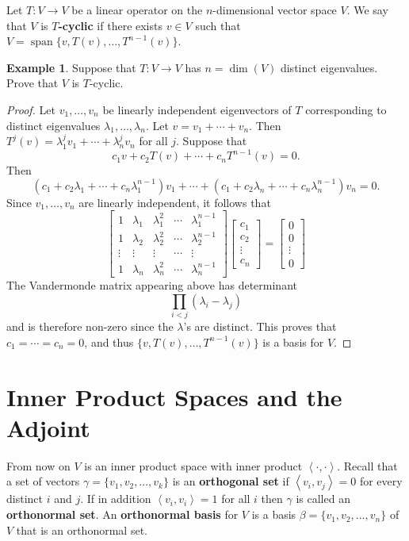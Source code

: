 \documentclass[12pt]{article}
\DeclareMathOperator{\spn}{span}
\newcommand{\tv}{T:V\rightarrow V}
\newcommand{\indot}[1]{\left\langle #1 \right\rangle}
\theoremstyle{definition}
\newtheorem{example}{Example}[section]
\begin{document}
Let $\tv$ be a linear operator on the $n$-dimensional vector space $V$.  We say that $V$ is \textbf{$T$-cyclic} if there exists $v\in V$ such that $V=\spn\{v,T(v),\ldots,T^{n-1}(v)\}$.
\begin{example}
Suppose that $\tv$ has $n=\dim(V)$ distinct eigenvalues.  Prove that $V$ is $T$-cyclic.
\end{example}
\begin{proof}
Let $v_1,\ldots,v_n$ be linearly independent eigenvectors of $T$ corresponding to distinct eigenvalues $\lambda_1,\ldots,\lambda_n$.  Let $v=v_1+\cdots+v_n$.  Then $T^j(v) = \lambda_1^j v_ 1 + \cdots + \lambda_n^j v_n$ for all $j$.  Suppose that
\[
c_1 v + c_2 T(v) + \cdots + c_n T^{n-1}(v)  = 0.
\]
Then
\[
(c_1 + c_2\lambda_1+\cdots+c_n \lambda^{n-1}_1)v_1 + \cdots + (c_1+c_2\lambda_n + \cdots + c_n \lambda_n^{n-1}) v_n = 0.
\]
Since $v_1,\ldots,v_n$ are linearly independent, it follows that
\[
\begin{bmatrix} 
1 & \lambda_1 & \lambda^2_1 & \cdots & \lambda_1^{n-1}\\
1 & \lambda_2 & \lambda^2_2 & \cdots & \lambda_2^{n-1}\\
\vdots & \vdots & \vdots & \cdots & \vdots \\
1 & \lambda_n & \lambda^2_n & \cdots & \lambda_n^{n-1}
\end{bmatrix}\begin{bmatrix}c_1\\c_2\\\vdots\\c_n\end{bmatrix} = \begin{bmatrix}0\\0\\\vdots\\0\end{bmatrix}
\]
The Vandermonde matrix appearing above has determinant
\[
\prod_{i<j} (\lambda_i-\lambda_j)
\]
and is therefore non-zero since the $\lambda$'s are distinct.  This proves that $c_1=\cdots=c_n=0$, and thus $\{v,T(v),\ldots,T^{n-1}(v)\}$ is a basis for $V$.
\end{proof}

\section{Inner Product Spaces and the Adjoint}

From now on $V$ is an inner product space with inner product $\indot{\cdot,\cdot}$.  Recall that a set of vectors $\gamma=\{v_1,v_2,\ldots,v_k\}$ is an \textbf{orthogonal set} if $\indot{v_i,v_j}=0$ for every distinct $i$ and $j$.  If in addition $\indot{v_i,v_i}=1$ for all $i$ then $\gamma$ is called an \textbf{orthonormal set}.  An \textbf{orthonormal basis} for $V$ is a basis $\beta=\{v_1,v_2,\ldots,v_n\}$ of $V$ that is an orthonormal set.  
\end{document}
